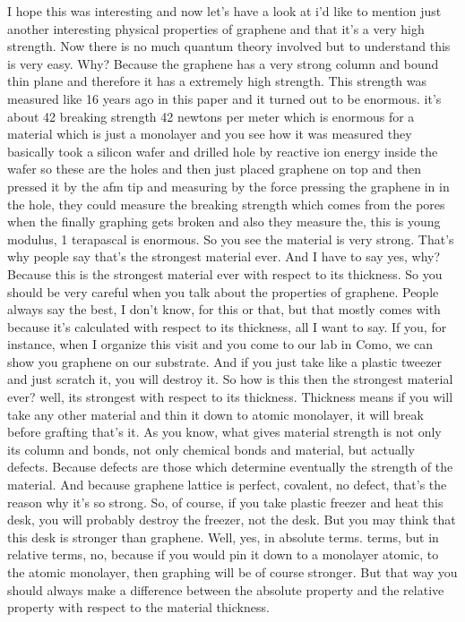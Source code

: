 I hope this was interesting and now let's have a look at i'd like to mention just another interesting physical properties of graphene and that it's a very high strength. Now there is no much quantum theory involved but to understand this is very easy. Why? Because the graphene has a very strong column and bound thin plane and therefore it has a extremely high strength. This strength was measured like 16 years ago in this paper and it turned out to be enormous. it's about 42 breaking strength 42 newtons per meter which is enormous for a material which is just a monolayer and you see how it was measured they basically took a silicon wafer and drilled hole by reactive ion energy inside the wafer so these are the holes and then just placed graphene on top and then pressed it by the afm tip and measuring by the force pressing the graphene in in the hole, they could measure the breaking strength which comes from the pores when the finally graphing gets broken and also they measure the, this is young modulus, 1 terapascal is enormous. So you see the material is very strong. That's why people say that's the strongest material ever. And I have to say yes, why? Because this is the strongest material ever with respect to its thickness. So you should be very careful when you talk about the properties of graphene. People always say the best, I don't know, for this or that, but that mostly comes with because it's calculated with respect to its thickness, all I want to say. If you, for instance, when I organize this visit and you come to our lab in Como, we can show you graphene on our substrate. And if you just take like a plastic tweezer and just scratch it, you will destroy it. So how is this then the strongest material ever? well, its strongest with respect to its thickness. Thickness means if you will take any other material and thin it down to atomic monolayer, it will break before grafting that's it. As you know, what gives material strength is not only its column and bonds, not only chemical bonds and material, but actually defects. Because defects are those which determine eventually the strength of the material. And because graphene lattice is perfect, covalent, no defect, that's the reason why it's so strong. So, of course, if you take plastic freezer and heat this desk, you will probably destroy the freezer, not the desk. But you may think that this desk is stronger than graphene. Well, yes, in absolute terms. terms, but in relative terms, no, because if you would pin it down to a monolayer atomic, to the atomic monolayer, then graphing will be of course stronger. But that way you should always make a difference between the absolute property and the relative property with respect to the material thickness.
